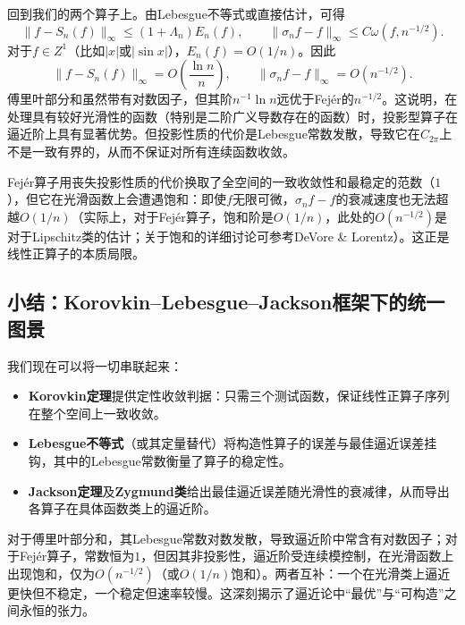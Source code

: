 回到我们的两个算子上。由Lebesgue不等式或直接估计，可得
\[
\|f-S_n(f)\|_\infty\le (1+\Lambda_n)E_n(f),\qquad
\|\sigma_nf-f\|_\infty\le C\omega(f,n^{-1/2}).
\]
对于$f\in Z^1$（比如$|x|$或$|\sin x|$），$E_n(f)=O(1/n)$。因此
\[
\|f-S_n(f)\|_\infty=O\!\left(\frac{\ln n}{n}\right),\qquad
\|\sigma_nf-f\|_\infty=O(n^{-1/2}).
\]
傅里叶部分和虽然带有对数因子，但其阶$n^{-1}\ln n$远优于Fejér的$n^{-1/2}$。这说明，在处理具有较好光滑性的函数（特别是二阶广义导数存在的函数）时，投影型算子在逼近阶上具有显著优势。但投影性质的代价是Lebesgue常数发散，导致它在$C_{2\pi}$上不是一致有界的，从而不保证对所有连续函数收敛。

Fejér算子用丧失投影性质的代价换取了全空间的一致收敛性和最稳定的范数（$1$），但它在光滑函数上会遭遇饱和：即使$f$无限可微，$\sigma_nf-f$的衰减速度也无法超越$O(1/n)$（实际上，对于Fejér算子，饱和阶是$O(1/n)$，此处的$O(n^{-1/2})$是对于Lipschitz类的估计；关于饱和的详细讨论可参考DeVore \& Lorentz）。这正是线性正算子的本质局限。

\subsection{小结：Korovkin–Lebesgue–Jackson框架下的统一图景}

我们现在可以将一切串联起来：
\begin{itemize}
\item \textbf{Korovkin定理}提供定性收敛判据：只需三个测试函数，保证线性正算子序列在整个空间上一致收敛。
\item \textbf{Lebesgue不等式}（或其定量替代）将构造性算子的误差与最佳逼近误差挂钩，其中的Lebesgue常数衡量了算子的稳定性。
\item \textbf{Jackson定理}及\textbf{Zygmund类}给出最佳逼近误差随光滑性的衰减律，从而导出各算子在具体函数类上的逼近阶。
\end{itemize}

对于傅里叶部分和，其Lebesgue常数对数发散，导致逼近阶中常含有对数因子；对于Fejér算子，常数恒为$1$，但因其非投影性，逼近阶受连续模控制，在光滑函数上出现饱和，仅为$O(n^{-1/2})$（或$O(1/n)$饱和）。两者互补：一个在光滑类上逼近更快但不稳定，一个稳定但速率较慢。这深刻揭示了逼近论中“最优”与“可构造”之间永恒的张力。